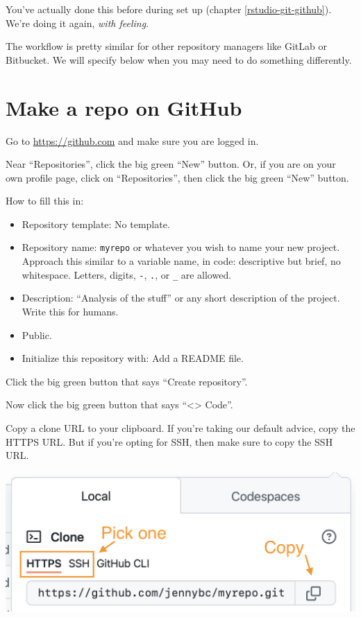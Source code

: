 \documentclass[
]{book}
\providecommand{\tightlist}{%
  \setlength{\itemsep}{0pt}\setlength{\parskip}{0pt}}
\begin{document}
You've actually done this before during set up (chapter \ref{rstudio-git-github}).
We're doing it again, \emph{with feeling}.

The workflow is pretty similar for other repository managers like GitLab or Bitbucket.
We will specify below when you may need to do something differently.

\section{Make a repo on GitHub}\label{make-a-repo-on-github-2}

Go to \url{https://github.com} and make sure you are logged in.

Near ``Repositories'', click the big green ``New'' button.
Or, if you are on your own profile page, click on ``Repositories'', then click the big green ``New'' button.

How to fill this in:

\begin{itemize}
\tightlist
\item
  Repository template: No template.
\item
  Repository name: \texttt{myrepo} or whatever you wish to name your new project. Approach this similar to a variable name, in code: descriptive but brief, no whitespace. Letters, digits, \texttt{-}, \texttt{.}, or \texttt{\_} are allowed.
\item
  Description: ``Analysis of the stuff'' or any short description of the project. Write this for humans.
\item
  Public.
\item
  Initialize this repository with: Add a README file.
\end{itemize}

Click the big green button that says ``Create repository''.

Now click the big green button that says ``\textless\textgreater{} Code''.

Copy a clone URL to your clipboard.
If you're taking our default advice, copy the HTTPS URL.
But if you're opting for SSH, then make sure to copy the SSH URL.

\begin{center}\includegraphics[width=0.6\linewidth]{img/github-https-or-ssh-url-annotated} \end{center}
\end{document}
